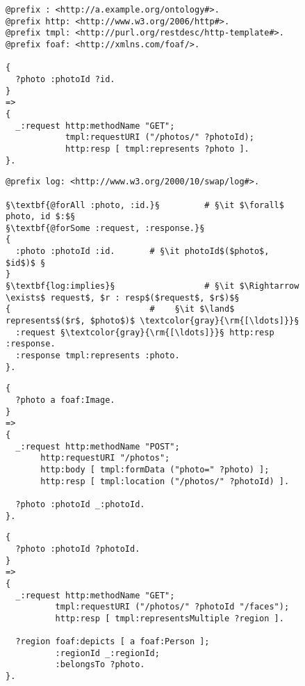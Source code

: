 \documentclass[runningheads,a4paper, twocolumn]{llncs}
\begin{document}
\begin{figure}[float=t!]
\begin{lstlisting}[caption=RESTdesc description of photo retrieval,
                   label=lst:PhotoGet, escapechar=§]
@prefix : <http://a.example.org/ontology#>.
@prefix http: <http://www.w3.org/2006/http#>.
@prefix tmpl: <http://purl.org/restdesc/http-template#>.
@prefix foaf: <http://xmlns.com/foaf/>.

{
  ?photo :photoId ?id.
}
=>
{
  _:request http:methodName "GET";
            tmpl:requestURI ("/photos/" ?photoId);
            http:resp [ tmpl:represents ?photo ].
}.
\end{lstlisting}

\begin{lstlisting}[caption=\autoref{lst:PhotoGet} with explicit quantifiers,
                   label=lst:PhotoGetQuantifiers, escapechar=§]
@prefix log: <http://www.w3.org/2000/10/swap/log#>.

§\textbf{@forAll :photo, :id.}§         # §\it $\forall$ photo, id $:$§
§\textbf{@forSome :request, :response.}§
{
  :photo :photoId :id.       # §\it photoId$($photo$, $id$)$ §
}
§\textbf{log:implies}§                  # §\it $\Rightarrow \exists$ request$, $r : resp$($request$, $r$)$§
{                            #    §\it $\land$ represents$($r$, $photo$)$ \textcolor{gray}{\rm{[\ldots]}}§
  :request §\textcolor{gray}{\rm{[\ldots]}}§ http:resp :response.
  :response tmpl:represents :photo.
}.
\end{lstlisting}

\begin{lstlisting}[caption=RESTdesc description of photo upload,
                   label=lst:PhotoUpload, escapechar=§]
{
  ?photo a foaf:Image.
}
=>
{
  _:request http:methodName "POST";
       http:requestURI "/photos";
       http:body [ tmpl:formData ("photo=" ?photo) ];
       http:resp [ tmpl:location ("/photos/" ?photoId) ].

  ?photo :photoId _:photoId.
}.
\end{lstlisting}

\begin{lstlisting}[caption=RESTdesc description of face detection,
                   label=lst:FaceDetection, escapechar=§]
{
  ?photo :photoId ?photoId.
}
=>
{
  _:request http:methodName "GET";
          tmpl:requestURI ("/photos/" ?photoId "/faces");
          http:resp [ tmpl:representsMultiple ?region ].
  
  ?region foaf:depicts [ a foaf:Person ];
          :regionId _:regionId;
          :belongsTo ?photo.
}.
\end{lstlisting}


\end{figure}
\end{document}
